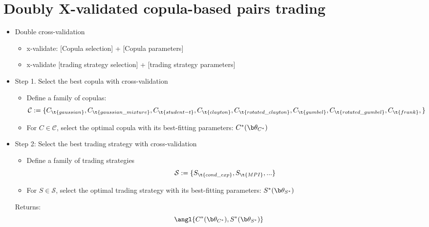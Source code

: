 \newpage
\section{Doubly X-validated copula-based pairs trading}




\begin{itemize}
\item Double cross-validation
\begin{itemize}
  \item x-validate: [Copula selection] + [Copula parameters]
  \item x-validate [trading strategy selection] + [trading strategy parameters]
\end{itemize}
\end{itemize}


\Vhrulefill

\begin{itemize}
  \item Step 1. Select the best copula with cross-validation	
\begin{itemize}
  \item Define a family of copulas: 
$$
\mathcal C := 
\{ 
C_{\t{gaussian}}, 
C_{\t{gaussian\_mixture}}, 
C_{\t{student-t}}, 
C_{\t{clayton}},
C_{\t{rotated\_clayton}}, 
C_{\t{gumbel}},
C_{\t{rotated\_gumbel}},
C_{\t{frank}},  
\}
$$
\item For $C\in\mathcal C$, select the optimal copula with its best-fitting parameters: $C^*(\b \theta_{C^*})$
\end{itemize}
\item Step 2: Select the best trading strategy with cross-validation
\begin{itemize}
  \item Define a family of trading strategies
$$
\mathcal S:=\{
S_{\t{cond\_exp}}, 
S_{\t{MPI}},
... 
\}
$$
  \item For $S\in\mathcal S$, select the optimal trading strategy with its best-fitting parameters: $S^*(\b \theta_{S^*})$
\end{itemize}

\Vhrulefill

Returns: $$\angl{C^*(\b \theta_{C^*}), S^*(\b \theta_{S^*})}$$


\end{itemize}
